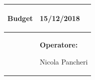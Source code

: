 \documentclass[a4paper]{article}
\begin{document}
                          \begin{center}
                          \begin{tabular}{|L{89mm} R{60mm}| }
                          \hline
                          \vspace{2.5mm}
                          \begin{spacing}{0}
                        \textbf{Budget}
                          \end{spacing}&
                          \vspace{2.5mm}
                          \begin{spacing}{0}

                        15/12/2018

                          \end{spacing}\\
                          \hline
                          \vspace{2.5mm}
                          \begin{spacing}{0}
                          
                        
                          \end{spacing} &
                          \vspace{2.5mm}
                          \begin{spacing}{0}
                            \textbf{Operatore:}

                       Nicola Pancheri
                          \end{spacing} \\
                          \hline
                          \end{tabular}
                          \end{center}
                       
\end{document}
